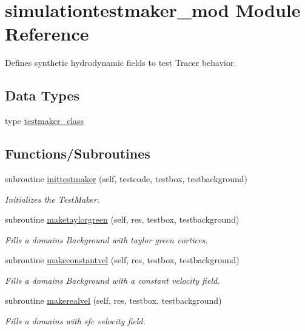 \hypertarget{namespacesimulationtestmaker__mod}{}\section{simulationtestmaker\+\_\+mod Module Reference}
\label{namespacesimulationtestmaker__mod}


Defines synthetic hydrodynamic fields to test Tracer behavior.  


\subsection*{Data Types}
\begin{DoxyCompactItemize}
\item 
type \mbox{\hyperlink{structsimulationtestmaker__mod_1_1testmaker__class}{testmaker\+\_\+class}}
\end{DoxyCompactItemize}
\subsection*{Functions/\+Subroutines}
\begin{DoxyCompactItemize}
\item 
subroutine \mbox{\hyperlink{namespacesimulationtestmaker__mod_a4ad5df056a516e03a3d1c17f6d3046cf}{inittestmaker}} (self, testcode, testbox, testbackground)
\begin{DoxyCompactList}\small\item\em Initializes the Test\+Maker. \end{DoxyCompactList}\item 
subroutine \mbox{\hyperlink{namespacesimulationtestmaker__mod_a45bbd32a561c88c18498d88f2d540cc4}{maketaylorgreen}} (self, res, testbox, testbackground)
\begin{DoxyCompactList}\small\item\em Fills a domain\textquotesingle{}s Background with taylor green vortices. \end{DoxyCompactList}\item 
subroutine \mbox{\hyperlink{namespacesimulationtestmaker__mod_a59ecca693ee5dfe472e2694c9399f0f0}{makeconstantvel}} (self, res, testbox, testbackground)
\begin{DoxyCompactList}\small\item\em Fills a domain\textquotesingle{}s Background with a constant velocity field. \end{DoxyCompactList}\item 
subroutine \mbox{\hyperlink{namespacesimulationtestmaker__mod_a99df61e4a45020aa1e2d30d33a4e2fa0}{makerealvel}} (self, res, testbox, testbackground)
\begin{DoxyCompactList}\small\item\em Fills a domain\textquotesingle{}s with sfc velocity field. \end{DoxyCompactList}\end{DoxyCompactItemize}
